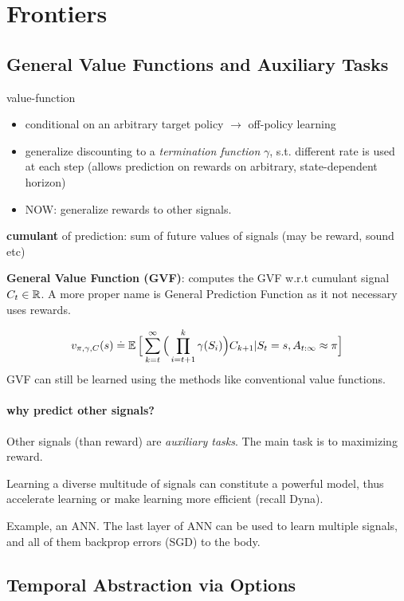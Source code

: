 \documentclass[sutton_barto_notes.tex]{subfiles}
\begin{document}
\newpage
\section{Frontiers}

\subsection{General Value Functions and Auxiliary Tasks}

value-function
\begin{itemize}
\item conditional on an arbitrary target policy $\rightarrow$ off-policy learning
\item generalize discounting to a \textit{termination function} $\gamma$, s.t. different rate is used at each step (allows prediction on rewards on arbitrary, state-dependent horizon)
\item NOW: generalize rewards to other signals.
\end{itemize}

\begin{definition}
\textbf{cumulant} of prediction: sum of future values of signals (may be reward, sound etc)
\end{definition}
\begin{definition}
\textbf{General Value Function (GVF)}: computes the GVF w.r.t cumulant signal $C_t \in \operatorname*{\mathbb{R}}$. A more proper name is General Prediction Function as it not necessary uses rewards.
\end{definition}
$$ v_{\pi, \gamma, C}(s) \doteq \operatorname*{\mathbb{E}} \Big[ \sum_{k=t}^\infty \Big( \prod_{i=t+1}^k \gamma (S_i) \Big) C_{k+1} | S_t = s, A_{t:\infty} \approx \pi \Big] $$
GVF can still be learned using the methods like conventional value functions.

\paragraph{why predict other signals?} Other signals (than reward) are \textit{auxiliary tasks}. The main task is to maximizing reward.

Learning a diverse multitude of signals can constitute a powerful model, thus accelerate learning or make learning more efficient (recall Dyna).

Example, an ANN. The last layer of ANN can be used to learn multiple signals, and all of them backprop errors (SGD) to the body.

\subsection{Temporal Abstraction via Options}
\end{document}
